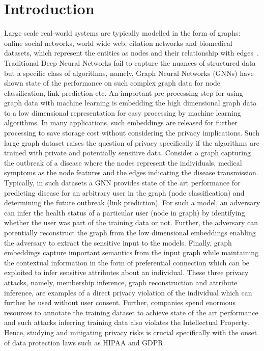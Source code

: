 \section{Introduction}\label{introduction}

Large scale real-world systems are typically modelled in the form of graphs: online social networks, world wide web, citation networks and biomedical datasets, which represent the entities as nodes and their relationship with edges~\cite{zhou2018graph}.
Traditional Deep Neural Networks fail to capture the nuances of structured data but a specific class of algorithms, namely, Graph Neural Networks (GNNs) have shown state of the performance on such complex graph data for node classification, link prediction etc.
An important pre-processing step for using graph data with machine learning is embedding the high dimensional graph data to a low dimensional representation for easy processing by machine learning algorithms.
In many applications, such embeddings are released for further processing to save storage cost without considering the privacy implications.
Such large graph dataset raises the question of privacy specifically if the algorithms are trained with private and potentially sensitive data.
Consider a graph capturing the outbreak of a disease where the nodes represent the individuals, medical symptoms as the node features and the edges indicating the disease transmission.
Typically, in such datasets a GNN provides state of the art performance for predicting disease for an arbitrary user in the graph (node classification) and determining the future outbreak (link prediction).
For such a model, an adversary can infer the health status of a particular user (node in graph) by identifying whether the user was part of the training data or not.
Further, the adversary can potentially reconstruct the graph from the low dimensional embeddings enabling the adversary to extract the sensitive input to the models.
Finally, graph embeddings capture important semantics from the input graph while maintaining the contextual information in the form of preferential connection which can be exploited to infer sensitive attributes about an individual.
These three privacy attacks, namely, membership inference, graph reconstruction and attribute inference, are examples of a direct privacy violation of the individual which can further be used without user consent. %
Further, companies spend enormous resources to annotate the training dataset to achieve state of the art performance and such attacks inferring training data also violates the Intellectual Property.
Hence, studying and mitigating privacy risks is crucial specifically with the onset of data protection laws such as HIPAA and GDPR.

